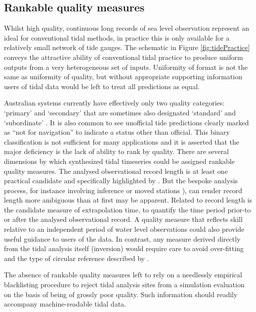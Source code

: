 \subsection{Rankable quality measures}
\label{sec:quality}
Whilst high quality, continuous long records of sea level observation represent an ideal for conventional tidal methods, in practice this is only available for a relatively small network of tide gauges.   
The schematic in Figure \ref{fig:tidePractice} conveys the attractive ability of conventional tidal practice to produce uniform outputs from a very heterogeneous set of inputs.
Uniformity of format is not the same as uniformity of quality, but without appropriate supporting information users of tidal data would be left to treat all predictions as equal.  

Australian systems currently have effectively only two quality categories: `primary' and `secondary' \citep{austides} that are sometimes also designated `standard' and `subordinate'  \citep{PCTMSL-sp9}.   
It is also common to see unofficial tide predictions clearly marked as ``not for navigation'' to indicate a status other than official.
This binary classification is not sufficient for many applications and it is asserted that the major deficiency is the lack of ability to rank by quality.   There are several dimensions by which synthesized tidal timeseries could be assigned rankable quality measures.    
The analysed observational record length is at least one practical candidate and specifically highlighted by \citeauthor{MHL2156}. But the bespoke analysis process, for instance involving inference or moved stations \citep{godin:1972}), can render record length more ambiguous than at first may be apparent.    
Related to record length is the candidate measure of extrapolation time, to quantify the time period prior-to or after the analysed observational record.     
A quality measure that reflects skill relative to an independent period of water level observations could also provide useful guidance to users of the data.    In contrast, any measure derived directly from the tidal analysis itself (inversion) would require care to avoid over-fitting and the type of circular reference described by  \citeauthor{Thompson2019}. 

The absence of rankable quality measures left \citeauthor{10.5194/os-2020-107} to rely on a needlessly empirical blacklisting procedure to reject tidal analysis sites from a simulation evaluation on the basis of being of grossly poor quality. Such information should readily accompany machine-readable tidal data.


